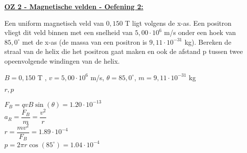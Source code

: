 \textbf{\underline{OZ 2 - Magnetische velden - Oefening 2:}}
\vspace{0.5cm}

Een uniform magnetisch veld van $ 0,150 $ T ligt volgens de x-as. Een positron vliegt dit veld binnen met een snelheid van $5, 00 \cdot 10^6 $ m/s onder een hoek van $85,0^{\circ}$ met de x-as (de massa van een positron is $9, 11 \cdot 10^{-31} $ kg). Bereken de straal van de helix die
het positron gaat maken en ook de afstand p tussen twee opeenvolgende windingen van de helix.


\begin{description}[labelwidth=1.5cm, leftmargin=!]
    \item[Geg. :]   $ B = 0,150 $ T ,
                    $ v = 5, 00 \cdot 10^6 $ m/s,
                    $ \theta = 85,0^{\circ} $,
                    $ m = 9, 11 \cdot 10^{-31} $ kg                 
    \item[Gevr. :]  $ r, p$
    \item[Opl. :]   $ F_{B} = qvB\sin(\theta) = 1.20 \cdot 10^{-13} $ 
                    \vspace{0.3cm}\\ 
                    \hspace{-0.57cm} $ a_{R} = \dfrac{F_{B}}{m} = \dfrac{v^2}{r}$ \vspace{0.3cm}\\ 
                    \hspace{-0.57cm} $ r = \dfrac{mv^2}{F_{B}} = 1.89 \cdot 10^{-4}$
                    \vspace{0.3cm}\\ 
                    \hspace{-0.57cm} $ p = 2\pi r \cos(85^{\circ}) = 1.04 \cdot 10^{-4}$
                    
\end{description}

\vspace{1cm}